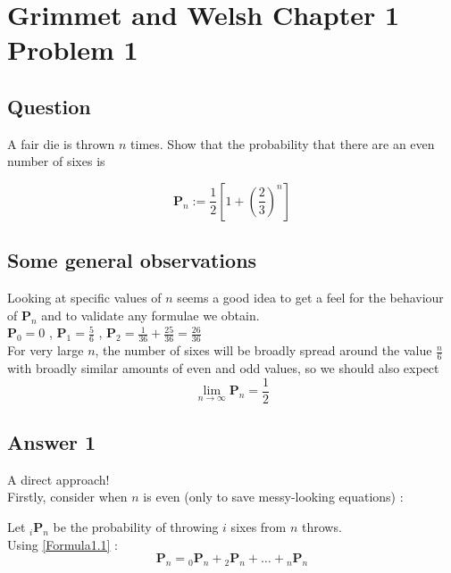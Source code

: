 \section{Grimmet and Welsh Chapter 1 Problem 1}
\subsection{Question}

A fair die is thrown $n$ times. Show that the probability that there are an even number of sixes is 
 
\begin{equation*} 
\mathbf{P}_n := \frac{1}{2}\left[1 + \left({\frac{2}{3}}\right)^n\right] 
\end{equation*}

\subsection{Some general observations}
Looking at specific values of $n$ seems a good idea to get a feel for the behaviour of $\mathbf{P}_n$ and to validate any formulae we obtain. \\
$\mathbf{P}_0 = 0$ ,
$\mathbf{P}_1 = \frac{5}{6}$ ,
$\mathbf{P}_2 = \frac{1}{36} + \frac{25}{36} = \frac{26}{36}$ \\

For very large $n$, the number of sixes will be broadly spread around the value $\frac{n}{6}$ with broadly similar amounts of even and odd values, so we should also expect  
\begin{equation*} 
\lim_{n \rightarrow \infty} \mathbf{P}_n = \frac{1}{2} 
\end{equation*}

\subsection{Answer 1}

A direct approach! \\

Firstly, consider when $n$ is even (only to save messy-looking equations) :

Let ${}_i\mathbf{P}_n$ be the probability of throwing $i$ sixes from $n$ throws.  \\
Using \eqref{Formula1.1} :
\begin{equation*} 
\mathbf{P}_n = {}_0\mathbf{P}_n + {}_2\mathbf{P}_n + \ldots + {}_n\mathbf{P}_n    
\end{equation*} 

